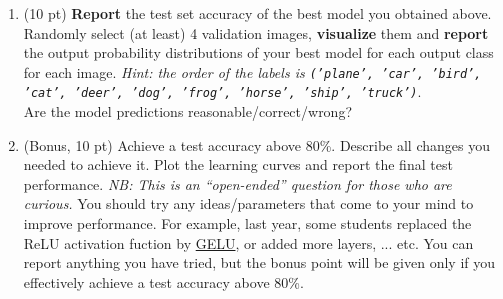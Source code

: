 \documentclass[a4paper,11pt]{article}
\begin{document}
\begin{enumerate}

\item (10 pt) \textbf{Report} the test set accuracy of the best model you obtained above.
Randomly select (at least) 4 validation images, \textbf{visualize} them and \textbf{report} the output probability distributions of your best model for each output class for each image. \textit{Hint: the order of the labels is \texttt{('plane', 'car', 'bird', 'cat',
           'deer', 'dog', 'frog', 'horse', 'ship', 'truck')}}.\\
Are the model predictions reasonable/correct/wrong?


\item (Bonus, 10 pt) Achieve a test accuracy above 80\%. Describe all changes you needed to achieve it. Plot the learning curves and report the final test performance.
\textit{NB: This is an ``open-ended'' question for those who are curious.} You should try any ideas/parameters that come to your mind to improve performance. For example, last year, some students replaced the ReLU activation fuction by \href{https://pytorch.org/docs/stable/generated/torch.nn.GELU.html}{GELU}, or added more layers, ... etc. You can report anything you have tried, but the bonus point will be given only if you effectively achieve a test accuracy above 80\%.

\end{enumerate}
\end{document}

